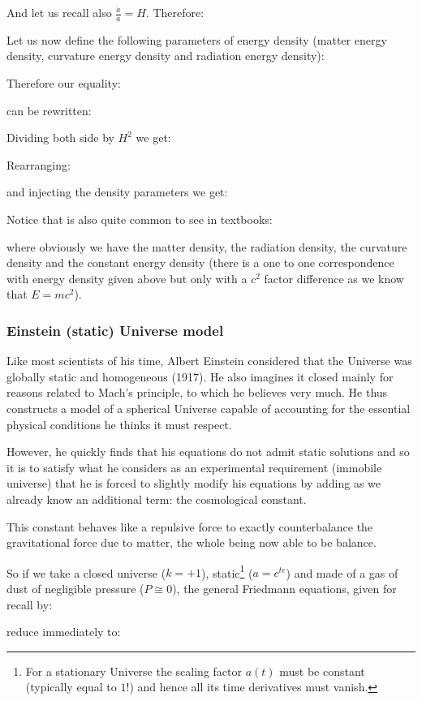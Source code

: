 	And let us recall also $\frac{\dot{a}}{a}=H$. Therefore:
	
	Let us now define the following parameters of energy density (matter energy density, curvature energy density and radiation energy density):
	
	Therefore our equality:
	
	can be rewritten:
	
	Dividing both side by $H^2$ we get:
	
	Rearranging:
	
	and injecting the density parameters we get:
	
	Notice that is also quite common to see in textbooks:
	
	where obviously we have the matter density, the radiation density, the curvature density and the constant energy density (there is a one to one correspondence with energy density given above but only with a $c^2$ factor difference as we know that $E= mc^2$).
	
	
	\subsubsection{Einstein (static) Universe model}\label{einstein static universe model}
	Like most scientists of his time, Albert Einstein considered that the Universe was globally static and homogeneous (1917). He also imagines it closed mainly for reasons related to Mach's principle, to which he believes very much. He thus constructs a model of a spherical Universe capable of accounting for the essential physical conditions he thinks it must respect.

	However, he quickly finds that his equations do not admit static solutions and so it is to satisfy what he considers as an experimental requirement (immobile universe) that he is forced to slightly modify his equations by adding as we already know an additional term: the cosmological constant.

	This constant behaves like a repulsive force to exactly counterbalance the gravitational force due to matter, the whole being now able to be balance.
	
	So if we take a closed universe ($k=+1$), static\footnote{For a stationary Universe the scaling factor $a(t)$ must be constant (typically equal to $1$!) and hence all its time derivatives must vanish.} ($a=c^{te}$) and made of a gas of dust of negligible pressure ($P\cong 0$), the general Friedmann equations, given for recall by:
	
	reduce immediately to:
	
